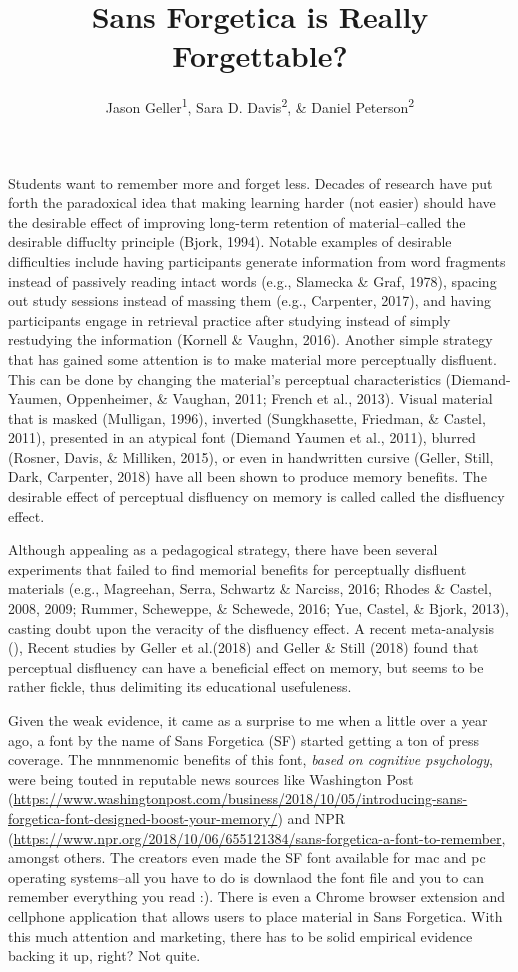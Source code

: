 \documentclass[doc]{apa6}
\affiliation{
\vspace{0.5cm}
\textsuperscript{1} University of Iowa\\\textsuperscript{2} Skidmore College}
\title{Sans Forgetica is Really Forgettable?}
\author{Jason Geller\textsuperscript{1}, Sara D. Davis\textsuperscript{2}, \& Daniel Peterson\textsuperscript{2}}
\date{}
\begin{document}
\maketitle

Students want to remember more and forget less. Decades of research have put forth the paradoxical idea that making learning harder (not easier) should have the desirable effect of improving long-term retention of material--called the desirable diffuclty principle (Bjork, 1994). Notable examples of desirable difficulties include having participants generate information from word fragments instead of passively reading intact words (e.g., Slamecka \& Graf, 1978), spacing out study sessions instead of massing them (e.g., Carpenter, 2017), and having participants engage in retrieval practice after studying instead of simply restudying the information (Kornell \& Vaughn, 2016). Another simple strategy that has gained some attention is to make material more perceptually disfluent. This can be done by changing the material's perceptual characteristics (Diemand-Yaumen, Oppenheimer, \& Vaughan, 2011; French et al., 2013). Visual material that is masked (Mulligan, 1996), inverted (Sungkhasette, Friedman, \& Castel, 2011), presented in an atypical font (Diemand Yaumen et al., 2011), blurred (Rosner, Davis, \& Milliken, 2015), or even in handwritten cursive (Geller, Still, Dark, Carpenter, 2018) have all been shown to produce memory benefits. The desirable effect of perceptual disfluency on memory is called called the disfluency effect.

Although appealing as a pedagogical strategy, there have been several experiments that failed to find memorial benefits for perceptually disfluent
materials (e.g., Magreehan, Serra, Schwartz \& Narciss, 2016; Rhodes \& Castel, 2008, 2009; Rummer, Scheweppe, \& Schewede, 2016; Yue,
Castel, \& Bjork, 2013), casting doubt upon the veracity of the disfluency effect. A recent meta-analysis (), Recent studies by Geller et al.(2018) and Geller \& Still (2018) found that perceptual disfluency can have a beneficial effect on memory, but seems to be rather fickle, thus delimiting its educational usefuleness.

Given the weak evidence, it came as a surprise to me when a little over a year ago, a font by the name of Sans Forgetica (SF) started getting a ton of press coverage. The mnnmenomic benefits of this font, \emph{based on cognitive psychology}, were being touted in reputable news sources like Washington Post (\url{https://www.washingtonpost.com/business/2018/10/05/introducing-sans-forgetica-font-designed-boost-your-memory/}) and NPR (\url{https://www.npr.org/2018/10/06/655121384/sans-forgetica-a-font-to-remember}, amongst others. The creators even made the SF font available for mac and pc operating systems--all you have to do is downlaod the font file and you to can remember everything you read :). There is even a Chrome browser extension and cellphone application that allows users to place material in Sans Forgetica. With this much attention and marketing, there has to be solid empirical evidence backing it up, right? Not quite.
\end{document}
